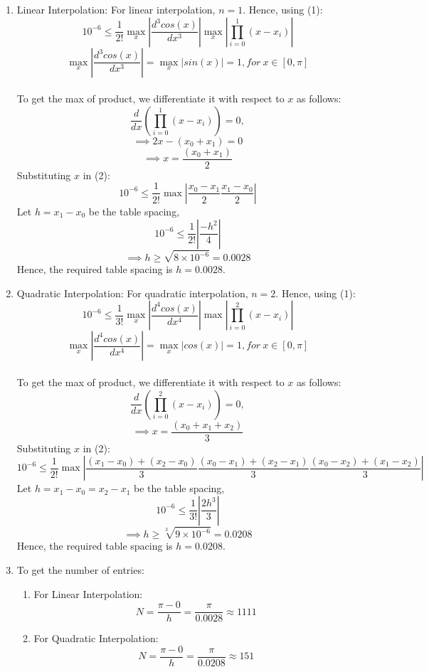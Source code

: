 \documentclass[10pt,letterpaper]{article}
\theoremstyle{definition}
\theoremstyle{remark}
\begin{document}
\begin{enumerate}[leftmargin=*,itemsep=9ex]
  \begin{enumerate}
    \item Linear Interpolation:
    For linear interpolation, $n=1$. Hence, using (1):
    \begin{equation}
      10^{-6} \leq \frac{1}{2!}\max_x{|\frac{d^3cos(x)}{dx^3}|}\max_x|\prod_{i=0}^{1} (x - x_i)|
    \end{equation}
    \[
      \max_x{|\frac{d^3cos(x)}{dx^3}|} = \max_x{|sin(x)|} = 1, for \ x \in [0, \pi]
    \]
    \\
    To get the max of product, we differentiate it with respect to $x$ as follows:
    \[
      \frac{d}{dx}(\prod_{i=0}^{1} (x - x_i)) = 0,
    \]
    \[
      \implies 2x - (x_0 + x_1) = 0
    \]
    \[
      \implies x = \frac{(x_0 + x_1)}{2}
    \]
    Substituting $x$ in (2):
    \[
      10^{-6} \leq \frac{1}{2!}\max|\frac{x_0 - x_1}{2}\frac{x_1 - x_0}{2}|
    \]
    Let $h = x_1 - x_0$ be the table spacing,
    \[
      10^{-6} \leq \frac{1}{2!}|\frac{-h^2}{4}|
    \]
    \[
      \implies h \geq \sqrt{8\times10^{-6}} = 0.0028
    \]
    Hence, the required table spacing is $h = 0.0028$.
    \\
    \item Quadratic Interpolation:
    For quadratic interpolation, $n=2$. Hence, using (1):
    \begin{equation}
      10^{-6} \leq \frac{1}{3!}\max_x{|\frac{d^4cos(x)}{dx^4}|}\max|\prod_{i=0}^{2} (x - x_i)|
    \end{equation}
    \[
      \max_x{|\frac{d^4cos(x)}{dx^4}|} = \max_x{|cos(x)|} = 1, for \ x \in [0, \pi]
    \]
    \\    
    To get the max of product, we differentiate it with respect to $x$ as follows:
    \[
      \frac{d}{dx}(\prod_{i=0}^{2} (x - x_i)) = 0,
    \]
    \[
      \implies x = \frac{(x_0 + x_1 + x_2)}{3}
    \]
    Substituting $x$ in (2):
    \[
      10^{-6} \leq \frac{1}{2!}\max|\frac{(x_1 - x_0) + (x_2 - x_0)}{3}\frac{(x_0 - x_1) + (x_2 - x_1)}{3}\frac{(x_0 - x_2) + (x_1 - x_2)}{3}|
    \]
    Let $h = x_1 - x_0 = x_2 - x_1$ be the table spacing,
    \[
      10^{-6} \leq \frac{1}{3!}|\frac{2h^3}{3}|
    \]
    \[
      \implies h \geq \sqrt[3]{9\times10^{-6}} = 0.0208
    \]
    Hence, the required table spacing is $h = 0.0208$.
    
    \item To get the number of entries:
    \begin{enumerate}
      \item For Linear Interpolation:
      \[
        N = \frac{\pi - 0}{h} = \frac{\pi}{0.0028} \approx 1111
      \]
      \item For Quadratic Interpolation:
      \[
        N = \frac{\pi - 0}{h} = \frac{\pi}{0.0208} \approx 151
      \]      
    \end{enumerate}
  \end{enumerate}
\end{enumerate}
\end{document}
